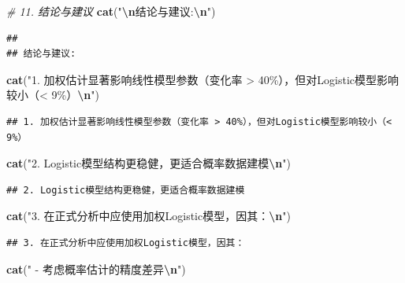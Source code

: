 \documentclass[
]{article}
\newenvironment{Shaded}{\begin{snugshade}}{\end{snugshade}}
\newcommand{\CommentTok}[1]{\textcolor[rgb]{0.56,0.35,0.01}{\textit{#1}}}
\newcommand{\FunctionTok}[1]{\textcolor[rgb]{0.13,0.29,0.53}{\textbf{#1}}}
\newcommand{\NormalTok}[1]{#1}
\newcommand{\SpecialCharTok}[1]{\textcolor[rgb]{0.81,0.36,0.00}{\textbf{#1}}}
\newcommand{\StringTok}[1]{\textcolor[rgb]{0.31,0.60,0.02}{#1}}
\begin{document}
\begin{Shaded}
\begin{Highlighting}[]
\CommentTok{\# 11. 结论与建议}
\FunctionTok{cat}\NormalTok{(}\StringTok{"}\SpecialCharTok{\textbackslash{}n}\StringTok{结论与建议:}\SpecialCharTok{\textbackslash{}n}\StringTok{"}\NormalTok{)}
\end{Highlighting}
\end{Shaded}

\begin{verbatim}
## 
## 结论与建议:
\end{verbatim}

\begin{Shaded}
\begin{Highlighting}[]
\FunctionTok{cat}\NormalTok{(}\StringTok{"1. 加权估计显著影响线性模型参数（变化率 \textgreater{} 40\%），但对Logistic模型影响较小（\textless{} 9\%）}\SpecialCharTok{\textbackslash{}n}\StringTok{"}\NormalTok{)}
\end{Highlighting}
\end{Shaded}

\begin{verbatim}
## 1. 加权估计显著影响线性模型参数（变化率 > 40%），但对Logistic模型影响较小（< 9%）
\end{verbatim}

\begin{Shaded}
\begin{Highlighting}[]
\FunctionTok{cat}\NormalTok{(}\StringTok{"2. Logistic模型结构更稳健，更适合概率数据建模}\SpecialCharTok{\textbackslash{}n}\StringTok{"}\NormalTok{)}
\end{Highlighting}
\end{Shaded}

\begin{verbatim}
## 2. Logistic模型结构更稳健，更适合概率数据建模
\end{verbatim}

\begin{Shaded}
\begin{Highlighting}[]
\FunctionTok{cat}\NormalTok{(}\StringTok{"3. 在正式分析中应使用加权Logistic模型，因其：}\SpecialCharTok{\textbackslash{}n}\StringTok{"}\NormalTok{)}
\end{Highlighting}
\end{Shaded}

\begin{verbatim}
## 3. 在正式分析中应使用加权Logistic模型，因其：
\end{verbatim}

\begin{Shaded}
\begin{Highlighting}[]
\FunctionTok{cat}\NormalTok{(}\StringTok{"   {-} 考虑概率估计的精度差异}\SpecialCharTok{\textbackslash{}n}\StringTok{"}\NormalTok{)}
\end{Highlighting}
\end{Shaded}
\end{document}
